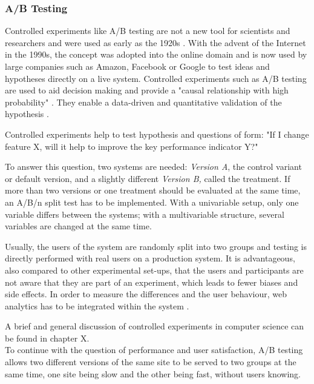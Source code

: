 \subsubsection{A/B Testing} %

Controlled experiments like A/B testing are not a new tool for scientists and researchers and were used as early as the 1920s \cite{2016Kohavi}.
With the advent of the Internet in the 1990s, the concept was adopted into the online domain and is now used by large companies such as Amazon, Facebook or Google to test ideas and hypotheses directly on a live system.
Controlled experiments such as A/B testing are used to aid decision making and provide a "causal relationship with high probability" \cite{2016Kohavi}.
They enable a data-driven and quantitative validation of the hypothesis \cite{2018Morys}.

Controlled experiments help to test hypothesis and questions of form: "If I change feature X, will it help to improve the key performance indicator Y?"

To answer this question,  two systems are needed: \textit{Version A}, the control variant or default version, and a slightly different \textit{Version B,} called the treatment.
If more than two versions or one treatment should be evaluated at the same time,  an A/B/n split test has to be implemented.
With a univariable setup, only one variable differs between the systems; with a multivariable structure, several variables are changed at the same time.

Usually, the users of the system are randomly split into two groups and testing is directly performed with real users on a production system.
It is advantageous, also compared to other experimental set-ups, that the users and participants are not aware that they are part of an experiment, which leads to fewer biases and side effects.
In order to measure the differences and the user behaviour, web analytics has to be integrated within the system \cite{2016Kohavi}.


A brief and general discussion of controlled experiments in computer science can be found in chapter X.  
\\


To continue with the question of performance and user satisfaction, A/B testing allows two different versions of the same site to be served to two groups at the same time, one site being slow and the other being fast, without users knowing.

